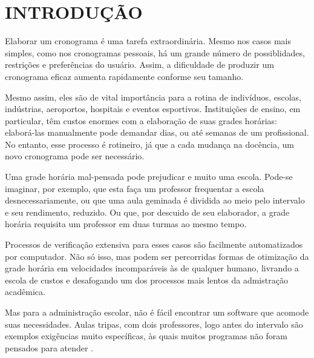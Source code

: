 \documentclass[12pt,a4paper]{article}
\begin{document}
	\newpage


	\section{INTRODUÇÃO}



		\par Elaborar um cronograma é uma tarefa extraordinária. Mesmo nos casos mais simples, como nos cronogramas pessoais, há um grande número de possiblidades, restrições e preferências do usuário. Assim, a dificuldade de produzir um cronograma eficaz aumenta rapidamente conforme seu tamanho.

		\par Mesmo assim, eles são de vital importância para a rotina de indivíduos, escolas, indústrias, aeroportos, hospitais e eventos esportivos. Instituições de ensino, em particular, têm custos enormes com a elaboração de suas grades horárias: elaborá-las manualmente pode demandar dias, ou até semanas \cite{appleby,nikita} de um profissional. No entanto, esse processo é rotineiro, já que a cada mudança na docência, um novo cronograma pode ser necessário.

		\par Uma grade horária mal-pensada pode prejudicar e muito uma escola. Pode-se imaginar, por exemplo, que esta faça um professor frequentar a escola desnecessariamente, ou que uma aula geminada é dividida ao meio pelo intervalo e seu rendimento, reduzido. Ou que, por descuido de seu elaborador, a grade horária requisita um professor em duas turmas ao mesmo tempo.

		\par Processos de verificação extensiva para esses casos são facilmente automatizados por computador. Não só isso, mas podem ser percorridas formas de otimização da grade horária em velocidades incomparáveis às de qualquer humano, livrando a escola de custos e desafogando um dos processos mais lentos da admistração acadêmica.

		\par Mas para a administração escolar, não é fácil encontrar um software que acomode suas necessidades. Aulas tripas, com dois professores, logo antes do intervalo são exemplos exigências muito específicas, às quais muitos programas não foram pensados para atender \cite{nikita, carter1995}.
\end{document}
